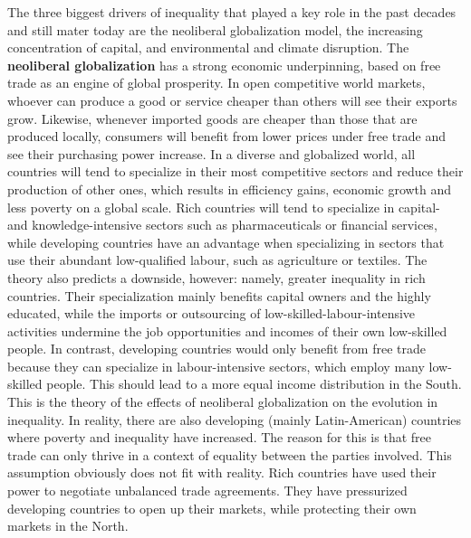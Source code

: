 \documentclass[../summary.tex]{subfiles}
\begin{document}
	The three biggest drivers of inequality that played a key role in the past decades and still mater today are the neoliberal globalization model, the increasing concentration of capital, and environmental and climate disruption.
	\newpage
	The \textbf{neoliberal globalization} has a strong economic underpinning, based on free trade as an engine of global prosperity. In open competitive world markets, whoever can produce a good or service cheaper than others will see their exports grow. Likewise, whenever imported goods are cheaper than those that are produced locally, consumers will benefit from lower prices under free trade and see their purchasing power increase. In a diverse and globalized world, all countries will tend to specialize in their most competitive sectors and reduce their production of other ones, which results in efficiency gains, economic growth and less poverty on a global scale. Rich countries will tend to specialize in capital- and knowledge-intensive sectors such as pharmaceuticals or financial services, while developing countries have an advantage when specializing in sectors that use their abundant low-qualified labour, such as agriculture or textiles. The theory also predicts a downside, however: namely, greater inequality in rich countries. Their specialization mainly benefits capital owners and the highly educated, while the imports or outsourcing of low-skilled-labour-intensive activities undermine the job opportunities and incomes of their own low-skilled people. In contrast, developing countries would only benefit from free trade because they can specialize in labour-intensive sectors, which employ many low-skilled people. This should lead to a more equal income distribution in the South. This is the theory of the effects of neoliberal globalization on the evolution in inequality. In reality, there are also developing (mainly Latin-American) countries where poverty and inequality have increased. The reason for this is that free trade can only thrive in a context of equality between the parties involved. This assumption obviously does not fit with reality. Rich countries have used their power to negotiate unbalanced trade agreements. They have pressurized developing countries to open up their markets, while protecting their own markets in the North.
	\\\\
\end{document}
